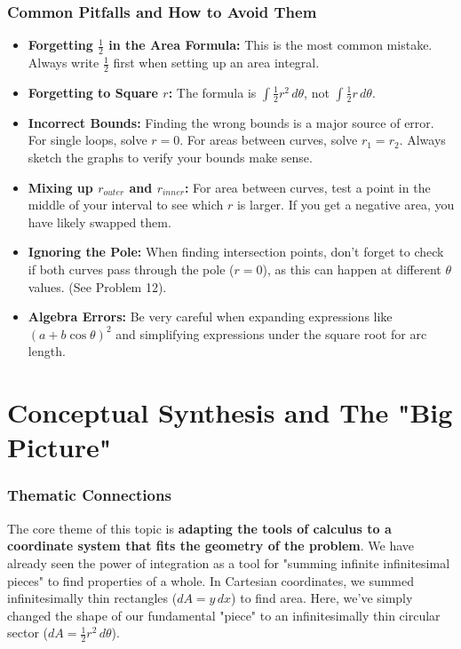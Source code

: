 \documentclass{article}
\begin{document}
\section{Common Pitfalls and How to Avoid Them}
\begin{itemize}
    \item \textbf{Forgetting $\frac{1}{2}$ in the Area Formula:} This is the most common mistake. Always write $\frac{1}{2}$ first when setting up an area integral.
    \item \textbf{Forgetting to Square $r$:} The formula is $\int \frac{1}{2} r^2 \,d\theta$, not $\int \frac{1}{2} r \,d\theta$.
    \item \textbf{Incorrect Bounds:} Finding the wrong bounds is a major source of error. For single loops, solve $r=0$. For areas between curves, solve $r_1=r_2$. Always sketch the graphs to verify your bounds make sense.
    \item \textbf{Mixing up $r_{outer}$ and $r_{inner}$:} For area between curves, test a point in the middle of your interval to see which $r$ is larger. If you get a negative area, you have likely swapped them.
    \item \textbf{Ignoring the Pole:} When finding intersection points, don't forget to check if both curves pass through the pole ($r=0$), as this can happen at different $\theta$ values. (See Problem 12).
    \item \textbf{Algebra Errors:} Be very careful when expanding expressions like $(a+b\cos\theta)^2$ and simplifying expressions under the square root for arc length.
\end{itemize}

\part{Conceptual Synthesis and The "Big Picture"}

\section{Thematic Connections}
The core theme of this topic is \textbf{adapting the tools of calculus to a coordinate system that fits the geometry of the problem}. We have already seen the power of integration as a tool for "summing infinite infinitesimal pieces" to find properties of a whole. In Cartesian coordinates, we summed infinitesimally thin rectangles ($dA = y\,dx$) to find area. Here, we've simply changed the shape of our fundamental "piece" to an infinitesimally thin circular sector ($dA = \frac{1}{2}r^2\,d\theta$).
\end{document}
